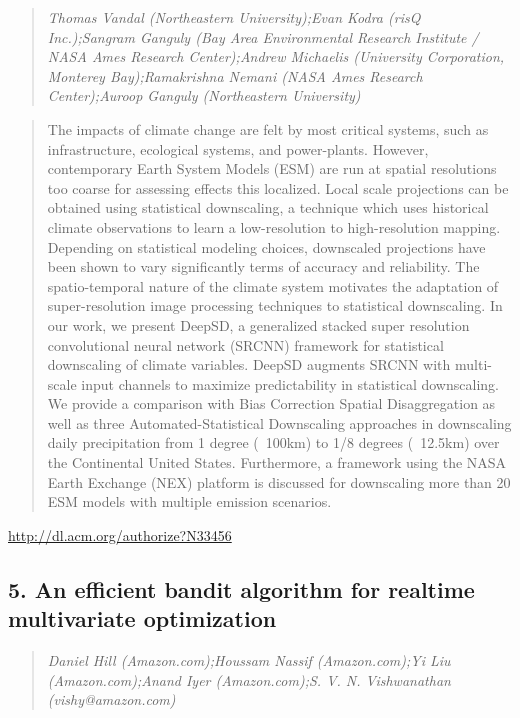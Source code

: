 \documentclass{article}
\begin{document}
\begin{quote}
\footnotesize{\textit{Thomas Vandal (Northeastern University);Evan Kodra (risQ Inc.);Sangram Ganguly (Bay Area Environmental Research Institute / NASA Ames Research Center);Andrew Michaelis (University Corporation, Monterey Bay);Ramakrishna Nemani (NASA Ames Research Center);Auroop Ganguly (Northeastern University)}}

\end{quote}

\begin{quote}
The impacts of climate change are felt by most critical systems, such as infrastructure, ecological systems, and power-plants. However, contemporary Earth System Models (ESM) are run at spatial resolutions too coarse for assessing effects this localized. Local scale projections can be obtained using statistical downscaling, a technique which uses historical climate observations to learn a low-resolution to high-resolution mapping. Depending on statistical modeling choices, downscaled projections have been shown to vary significantly terms of accuracy and reliability. The spatio-temporal nature of the climate system motivates the adaptation of super-resolution image processing techniques to statistical downscaling. In our work, we present DeepSD, a generalized stacked super resolution convolutional neural network (SRCNN) framework for statistical downscaling of climate variables. DeepSD augments SRCNN with multi-scale input channels to maximize predictability in statistical downscaling. We provide a comparison with Bias Correction Spatial Disaggregation as well as three Automated-Statistical Downscaling approaches in downscaling daily precipitation from 1 degree (~100km) to 1/8 degrees (~12.5km) over the Continental United States. Furthermore, a framework using the NASA Earth Exchange (NEX) platform is discussed for downscaling more than 20 ESM models with multiple emission scenarios.
\end{quote}

\href{http://dl.acm.org/authorize?N33456}{http://dl.acm.org/authorize?N33456}

\subsection{5. An efficient bandit algorithm for realtime multivariate optimization}

\begin{quote}
\footnotesize{\textit{Daniel Hill (Amazon.com);Houssam Nassif (Amazon.com);Yi Liu (Amazon.com);Anand Iyer (Amazon.com);S. V. N. Vishwanathan (vishy@amazon.com)}}

\end{quote}
\end{document}
